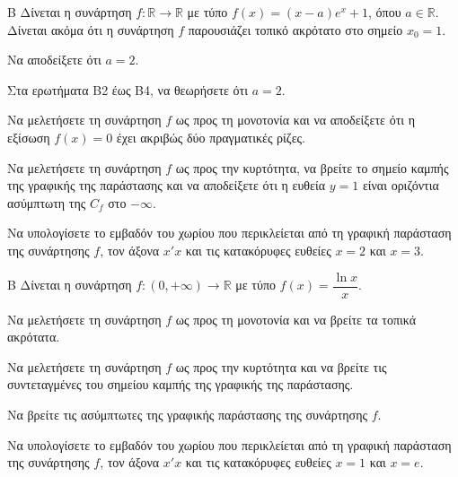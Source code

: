 \begin{thema}{Β}
Δίνεται η συνάρτηση $f: \mathbb{R} \to \mathbb{R}$ με τύπο $f(x) = (x-a)e^x + 1$, όπου $a \in \mathbb{R}$. Δίνεται ακόμα ότι η συνάρτηση $f$ παρουσιάζει τοπικό ακρότατο στο σημείο $x_0 = 1$.

\begin{erwthma}
\item Να αποδείξετε ότι $a = 2$. 

Στα ερωτήματα Β2 έως Β4, να θεωρήσετε ότι $a = 2$.
\item Να μελετήσετε τη συνάρτηση $f$ ως προς τη μονοτονία και να αποδείξετε ότι η εξίσωση $f(x) = 0$ έχει ακριβώς δύο πραγματικές ρίζες. 
\item Να μελετήσετε τη συνάρτηση $f$ ως προς την κυρτότητα, να βρείτε το σημείο καμπής της γραφικής της παράστασης και να αποδείξετε ότι η ευθεία $y = 1$ είναι οριζόντια ασύμπτωτη της $C_f$ στο $-\infty$. 
\item Να υπολογίσετε το εμβαδόν του χωρίου που περικλείεται από τη γραφική παράσταση της συνάρτησης $f$, τον άξονα $x'x$ και τις κατακόρυφες ευθείες $x = 2$ και $x = 3$. 
\end{erwthma}
\end{thema}
\begin{thema}{Β}
Δίνεται η συνάρτηση $f:(0, +\infty) \to \mathbb{R}$ με τύπο $f(x) = \dfrac{\ln x}{x}$.
\begin{erwthma}
\item Να μελετήσετε τη συνάρτηση $f$ ως προς τη μονοτονία και να βρείτε τα τοπικά ακρότατα.
\item Να μελετήσετε τη συνάρτηση $f$ ως προς την κυρτότητα και να βρείτε τις συντεταγμένες του σημείου καμπής της γραφικής της παράστασης.
\item Να βρείτε τις ασύμπτωτες της γραφικής παράστασης της συνάρτησης $f$.
\item Να υπολογίσετε το εμβαδόν του χωρίου που περικλείεται από τη γραφική παράσταση της συνάρτησης $f$, τον άξονα $x'x$ και τις κατακόρυφες ευθείες $x = 1$ και $x = e$.
\end{erwthma}
\end{thema}

